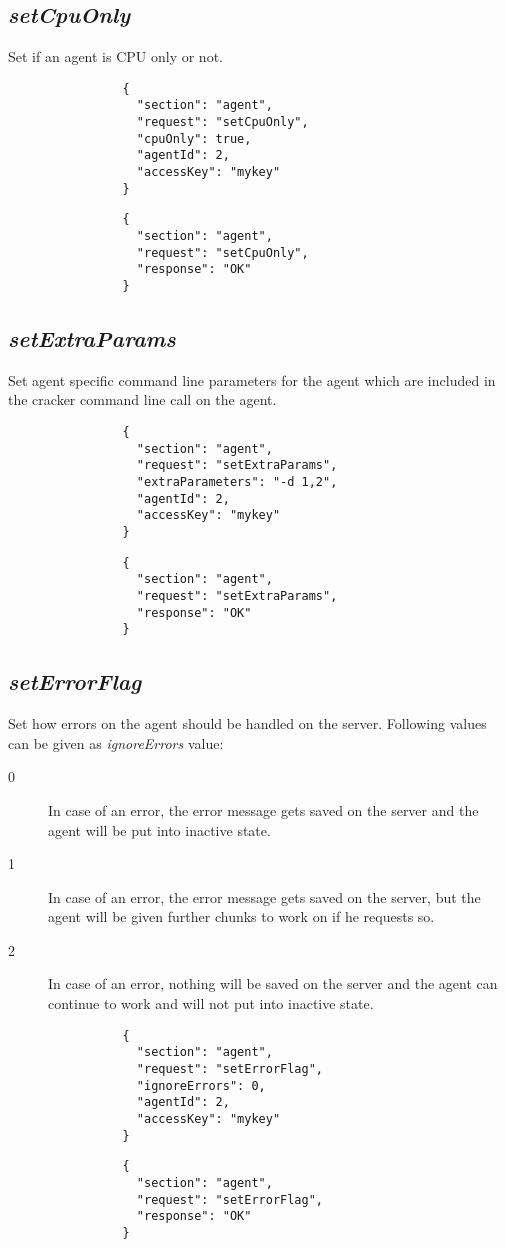 		\subsection*{\textit{setCpuOnly}}
			Set if an agent is CPU only or not.
			{
				\color{blue}
				\begin{verbatim}
				{
				  "section": "agent",
				  "request": "setCpuOnly",
				  "cpuOnly": true,
				  "agentId": 2,
				  "accessKey": "mykey"
				}
				\end{verbatim}
			}
			{
				\color{OliveGreen}
				\begin{verbatim}
				{
				  "section": "agent",
				  "request": "setCpuOnly",
				  "response": "OK"
				}
				\end{verbatim}
			}
		\subsection*{\textit{setExtraParams}}
			Set agent specific command line parameters for the agent which are included in the cracker command line call on the agent.
			{
				\color{blue}
				\begin{verbatim}
				{
				  "section": "agent",
				  "request": "setExtraParams",
				  "extraParameters": "-d 1,2",
				  "agentId": 2,
				  "accessKey": "mykey"
				}
				\end{verbatim}
			}
			{
				\color{OliveGreen}
				\begin{verbatim}
				{
				  "section": "agent",
				  "request": "setExtraParams",
				  "response": "OK"
				}
				\end{verbatim}
			}
		\subsection*{\textit{setErrorFlag}}
			Set how errors on the agent should be handled on the server. Following values can be given as \textit{ignoreErrors} value:
			\begin{description}
				\item[0] In case of an error, the error message gets saved on the server and the agent will be put into inactive state.
				\item[1] In case of an error, the error message gets saved on the server, but the agent will be given further chunks to work on if he requests so.
				\item[2] In case of an error, nothing will be saved on the server and the agent can continue to work and will not put into inactive state.
			\end{description}
			{
				\color{blue}
				\begin{verbatim}
				{
				  "section": "agent",
				  "request": "setErrorFlag",
				  "ignoreErrors": 0,
				  "agentId": 2,
				  "accessKey": "mykey"
				}
				\end{verbatim}
			}
			{
				\color{OliveGreen}
				\begin{verbatim}
				{
				  "section": "agent",
				  "request": "setErrorFlag",
				  "response": "OK"
				}
				\end{verbatim}
			}
